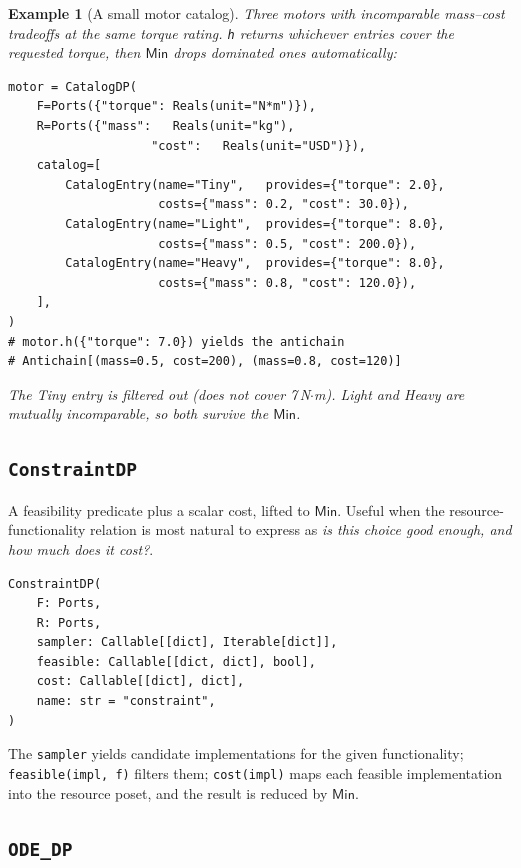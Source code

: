 \documentclass[11pt,a4paper]{article}
\newtheorem{example}[definition]{Example}
\newcommand{\Min}{\mathsf{Min}}
\begin{document}
\begin{example}[A small motor catalog]
Three motors with incomparable mass--cost tradeoffs at the same
torque rating. \texttt{h} returns whichever entries cover the
requested torque, then $\Min$ drops dominated ones automatically:
\begin{lstlisting}
motor = CatalogDP(
    F=Ports({"torque": Reals(unit="N*m")}),
    R=Ports({"mass":   Reals(unit="kg"),
                    "cost":   Reals(unit="USD")}),
    catalog=[
        CatalogEntry(name="Tiny",   provides={"torque": 2.0},
                     costs={"mass": 0.2, "cost": 30.0}),
        CatalogEntry(name="Light",  provides={"torque": 8.0},
                     costs={"mass": 0.5, "cost": 200.0}),
        CatalogEntry(name="Heavy",  provides={"torque": 8.0},
                     costs={"mass": 0.8, "cost": 120.0}),
    ],
)
# motor.h({"torque": 7.0}) yields the antichain
# Antichain[(mass=0.5, cost=200), (mass=0.8, cost=120)]
\end{lstlisting}
The Tiny entry is filtered out (does not cover 7\,N$\cdot$m). Light
and Heavy are mutually incomparable, so both survive the $\Min$.
\end{example}

\subsection{\texttt{ConstraintDP}}

A feasibility predicate plus a scalar cost, lifted to $\Min$. Useful
when the resource-functionality relation is most natural to express
as \emph{is this choice good enough, and how much does it cost?}.

\begin{lstlisting}
ConstraintDP(
    F: Ports,
    R: Ports,
    sampler: Callable[[dict], Iterable[dict]],
    feasible: Callable[[dict, dict], bool],
    cost: Callable[[dict], dict],
    name: str = "constraint",
)
\end{lstlisting}

The \texttt{sampler} yields candidate implementations for the given
functionality; \texttt{feasible(impl, f)} filters them; \texttt{cost(impl)}
maps each feasible implementation into the resource poset, and the result
is reduced by $\Min$.

\subsection{\texttt{ODE\_DP}}
\end{document}
